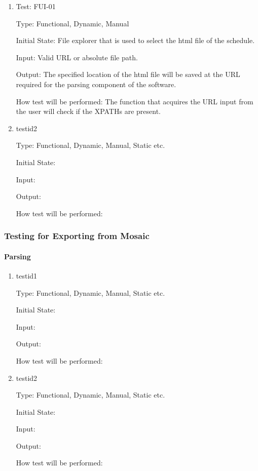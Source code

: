 \documentclass[12pt, titlepage]{article}
\begin{document}
\begin{enumerate}

\item{Test: FUI-01\\}

Type: Functional, Dynamic, Manual
					
Initial State:  File explorer that is used to select the html file of the schedule.
					
Input: Valid URL or absolute file path.

					
Output: The specified location of the html file will be saved at the URL required for the parsing component of the software.

					
How test will be performed: The function that acquires the URL input from the user will check if the XPATHs are present.

					
\item{testid2\\}

Type: Functional, Dynamic, Manual, Static etc.
					
Initial State: 
					
Input: 
					
Output: 
					
How test will be performed: 

\end{enumerate}

\subsubsection{Testing for Exporting from Mosaic}

\paragraph{Parsing}

\begin{enumerate}

\item{testid1\\}

Type: Functional, Dynamic, Manual, Static etc.
					
Initial State: 
					
Input: 
					
Output: 
					
How test will be performed: 

\item{testid2\\}

Type: Functional, Dynamic, Manual, Static etc.
					
Initial State: 
					
Input: 
					
Output: 
					
How test will be performed: 
\end{enumerate}
\end{document}
